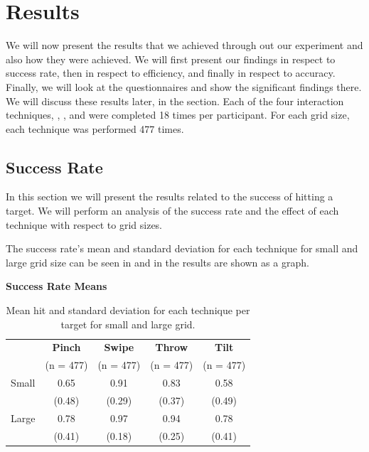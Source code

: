 \section{Results}
We will now present the results that we achieved through out our experiment and also how they were achieved. We will first present our findings in respect to success rate, then in respect to efficiency, and finally in respect to accuracy. Finally, we will look at the questionnaires and show the significant findings there. We will discuss these results later, in the  section.  
Each of the four interaction techniques, \pinch, \swipe, \throw and \tilt were completed 18 times per participant. 
For each grid size, each technique was performed 477 times. 

\subsection{Success Rate}
In this section we will present the results related to the success of hitting a target.
We will perform an analysis of the success rate and the effect of each technique with respect to grid sizes.

The success rate's mean and standard deviation for each technique for small and large grid size can be seen in  and in  the results are shown as a graph.

\begin{table}[H]
	\centering
	\textbf{Success Rate Means}\\[4pt]
	\begin{adjustbox}{width=\columnwidth}
	\begin{tabular}{|c|c|c|c|c|}
			\hline
			\rowcolor[HTML]{9B9B9B} 
			& \textbf{Pinch} & \textbf{Swipe} & \textbf{Throw} & \textbf{Tilt} \\
			\rowcolor[HTML]{9B9B9B} 
			 & (n = 477) & (n = 477) & (n = 477) & (n = 477) \\ \hline
			Small & 0.65        & 0.91         & 0.83         & 0.58        \\
			 & (0.48)        & (0.29)         & (0.37)         & (0.49)        \\ \hline
			Large & 0.78        & 0.97         & 0.94         & 0.78        \\
			 & (0.41)        & (0.18)         & (0.25)         & (0.41)        \\ \hline
	\end{tabular}
	\end{adjustbox}
	\caption{Mean hit  and standard deviation for each technique per target for small and large grid.}
	\label{tab:meanHitTechnique}
\end{table}

